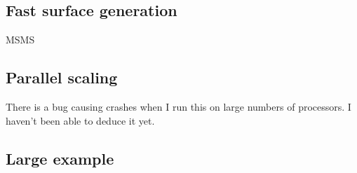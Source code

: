 \documentclass{elsarticle}
\theoremstyle{own}
\begin{document}
\subsection{Fast surface generation}

MSMS \cite{Sanner;Olson;Spehner;etal:96:REDUCED-SURFACE:-an-}






\subsection{Parallel scaling}

There is a bug causing crashes when I run this on large numbers of processors. I haven't been able to deduce it yet. 

\subsection{Large example}
\end{document}
